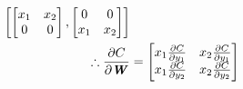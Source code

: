 \documentclass{article}
\begin{document}
\begin{enumerate}
\begin{equation}
\begin{split}
\begin{bmatrix}
                                \begin{bmatrix}
                                    x_{1}&x_{2}\\
                                    0&0
                                \end{bmatrix},
                                \begin{bmatrix}
                                    0&0\\
                                    x_{1}&x_{2}
                                \end{bmatrix}
                            \end{bmatrix}\\
            \therefore \frac{\partial C}{\partial \textbf{\textit{W}}}&= \begin{bmatrix}
                                    x_{1}\frac{\partial C}{\partial y_{1}}&x_{2}\frac{\partial C}{\partial y_{1}}\\
                                    x_{1}\frac{\partial C}{\partial y_{2}}&x_{2}\frac{\partial C}{\partial y_{2}}
                                \end{bmatrix}
                \end{split}
            \end{equation}\label{dcdw}
            

\end{enumerate}
\end{document}
